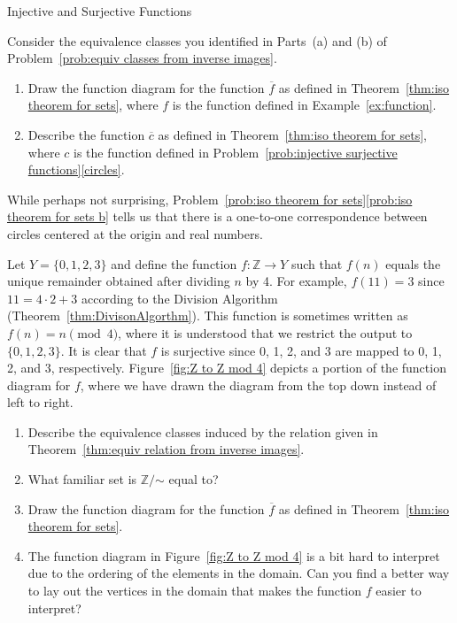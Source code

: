 \begin{section}{Injective and Surjective Functions}
\begin{problem}\label{prob:iso theorem for sets}
Consider the equivalence classes you identified in Parts~(a) and (b) of Problem~\ref{prob:equiv classes from inverse images}.
\begin{enumerate}[label=\textrm{(\alph*)}]
\item Draw the function diagram for the function $\overline{f}$ as defined in Theorem~\ref{thm:iso theorem for sets}, where $f$ is the function defined in Example~\ref{ex:function}.
\item\label{prob:iso theorem for sets b} Describe the function $\overline{c}$ as defined in Theorem~\ref{thm:iso theorem for sets}, where $c$ is the function defined in Problem~\ref{prob:injective surjective functions}\ref{circles}.
\end{enumerate}
\end{problem}

While perhaps not surprising, Problem~\ref{prob:iso theorem for sets}\ref{prob:iso theorem for sets b} tells us that there is a one-to-one correspondence between circles centered at the origin and real numbers.

\begin{problem}\label{prob:Z to Z mod 4}
Let $Y=\{0,1,2,3\}$ and define the function $f:\mathbb{Z}\to Y$ such that $f(n)$ equals the unique remainder obtained after dividing $n$ by 4. For example, $f(11)=3$ since $11=4\cdot 2+3$ according to the Division Algorithm (Theorem~\ref{thm:DivisonAlgorthm}). This function is sometimes written as $f(n)=n \pmod{4}$, where it is understood that we restrict the output to $\{0,1,2,3\}$. It is clear that $f$ is surjective since 0, 1, 2, and 3 are mapped to 0, 1, 2, and 3, respectively.  Figure~\ref{fig:Z to Z mod 4} depicts a portion of the function diagram for $f$, where we have drawn the diagram from the top down instead of left to right.
\begin{enumerate}[label=\textrm{(\alph*)}]
\item Describe the equivalence classes induced by the relation given in Theorem~\ref{thm:equiv relation from inverse images}.
\item What familiar set is $\mathbb{Z}/\mathord\sim$ equal to?
\item Draw the function diagram for the function $\overline{f}$ as defined in Theorem~\ref{thm:iso theorem for sets}.
\item The function diagram in Figure~\ref{fig:Z to Z mod 4} is a bit hard to interpret due to the ordering of the elements in the domain.  Can you find a better way to lay out the vertices in the domain that makes the function $f$ easier to interpret?
\end{enumerate}
\end{problem}


\end{section}
